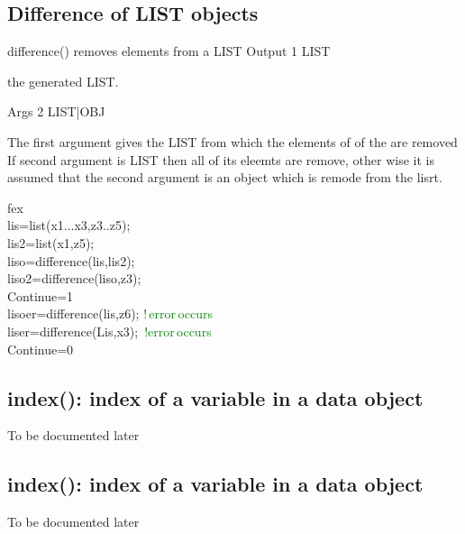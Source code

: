 \begin{itemize}
\subsection{Difference of LIST objects}
\label{difference}
\textcolor{VioletRed}{difference}() removes elements from a LIST
\vspace{0.3cm}
\hline
\vspace{0.3cm}
\noindent Output \tabto{3cm}  1 \tabto{5cm}  LIST  \tabto{7cm}
\begin{changemargin}{3cm}{0cm}
\noindent  the generated LIST.
\end{changemargin}
\vspace{0.3cm}
\hline
\vspace{0.3cm}
\noindent Args \tabto{3cm} 2 \tabto{5cm}  LIST|OBJ  \tabto{7cm}
\begin{changemargin}{3cm}{0cm}
\noindent  The first argument gives the LIST from which the elements of of the
are removed  If second argument is LIST then all of its eleemts are remove, other wise
it is assumed that the second argument is an object which is remode from the lisrt.
\end {changemargin}
\hline
\vspace{0.2cm}
\begin{example}[diffex]fex\\
\label{diffex}
lis=\textcolor{VioletRed}{list}(x1...x3,z3..z5);\\
lis2=\textcolor{VioletRed}{list}(x1,z5);\\
liso=\textcolor{VioletRed}{difference}(lis,lis2);\\
liso2=\textcolor{VioletRed}{difference}(liso,z3);\\
Continue=1\\
lisoer=\textcolor{VioletRed}{difference}(lis,z6); \textcolor{green}{!\,error\,occurs}\\
liser=\textcolor{VioletRed}{difference}(Lis,x3); \,\textcolor{green}{!error\,occurs}\\
Continue=0
\end{example}
\subsection{\textcolor{VioletRed}{index}(): index of a variable in a data object}
\label{index}
To be documented later
\subsection{\textcolor{VioletRed}{index}(): index of a variable in a data object}
\label{index}
To be documented later

\end{itemize}
